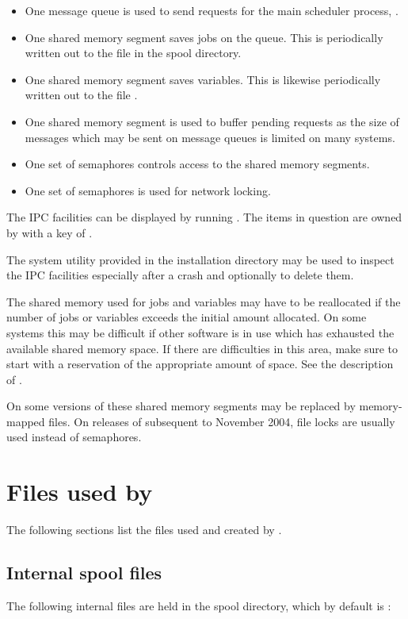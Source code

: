 \begin{itemize}
\item One message queue is used to send requests for the main scheduler process, .
\item One shared memory segment saves jobs on the queue. This is periodically written out to the file 
in the spool directory.
\item One shared memory segment saves variables. This is likewise periodically written out to the file .
\item One shared memory segment is used to buffer pending requests as the size of messages which may be sent on message queues is limited on many systems.
\item One set of semaphores controls access to the shared memory segments.
\item One set of semaphores is used for network locking.
\end{itemize}
The IPC facilities can be displayed by running . The items in question are owned by \batchuser{}
with a key of .

The system utility \PrXbRipc{} provided in the installation directory may be used to inspect the IPC facilities
especially after a crash and optionally to delete them.

The shared memory used for jobs and variables may have to be reallocated if the number of jobs or variables exceeds the initial amount
allocated. On some systems this may be difficult if other software is in use which has exhausted the available shared memory space. If there are difficulties in this area, make sure to start \ProductName{} with a reservation of the appropriate amount of space. See the
description of \PrBtstart.

On some versions of \ProductName{} these shared memory segments may be replaced by memory-mapped files. On releases of
\ProductName{} subsequent to November 2004, file locks are usually used instead of semaphores.

\section{Files used by \ProductName{}}
The following sections list the files used and created by \ProductName{}.

\subsection{Internal spool files}
The following \ProductName{} internal files are held in the spool directory, which by default is \spooldir:


